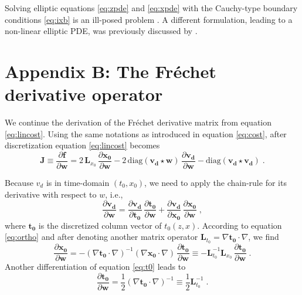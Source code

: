 Solving elliptic equations \ref{eq:zpde} and \ref{eq:xpde} with the Cauchy-type boundary conditions 
\ref{eq:ixb} is an ill-posed problem \cite[]{evans}. A different formulation, leading to a non-linear 
elliptic PDE, was previously discussed by \cite{cameron3}.

\appendix
\section{Appendix B: The Fr\'{e}chet derivative operator}

We continue the derivation of the Fr\'{e}chet derivative matrix from equation 
\ref{eq:lincost}. Using the same notations as introduced in equation \ref{eq:cost}, after discretization equation 
\ref{eq:lincost} becomes 
\begin{equation}
\label{eq:gradient}
\mathbf{J} \equiv \frac{\partial \mathbf{f}}{\partial \mathbf{w}} 
= 2\,\mathbf{L}_{x_0}\,\frac{\partial \mathbf{x_0}}{\partial \mathbf{w}} 
- 2\,\mbox{diag}(\mathbf{v_d} \star \mathbf{w})\,\frac{\partial \mathbf{v_d}}{\partial \mathbf{w}} 
- \mbox{diag}(\mathbf{v_d} \star \mathbf{v_d})\;.
\end{equation}

Because $v_d$ is in time-domain $(t_0,x_0)$, we need to apply the chain-rule for its derivative with respect to 
$w$, i.e.,
\begin{equation}
\label{eq:dvdix}
\frac{\partial \mathbf{v_d}}{\partial \mathbf{w}} = \frac{\partial \mathbf{v_d}}{\partial \mathbf{t_0}} 
\,\frac{\partial \mathbf{t_0}}{\partial \mathbf{w}} + \frac{\partial \mathbf{v_d}}{\partial \mathbf{x_0}} 
\,\frac{\partial \mathbf{x_0}}{\partial \mathbf{w}}\;,
\end{equation}
where $\mathbf{t_0}$ is the discretized column vector of $t_0 (z,x)$. According to equation \ref{eq:ortho} and 
after denoting another matrix operator $\mathbf{L}_{t_0} = \nabla \mathbf{t_0} \cdot \nabla$, we find
\begin{equation}
\label{eq:dortho}
\frac{\partial \mathbf{x_0}}{\partial \mathbf{w}} = 
- (\nabla \mathbf{t_0} \cdot \nabla)^{-1}(\nabla \mathbf{x_0} \cdot \nabla)\,
\frac{\partial \mathbf{t_0}}{\partial \mathbf{w}} \equiv 
- \mathbf{L}_{t_0}^{-1} \mathbf{L}_{x_0}\,\frac{\partial \mathbf{t_0}}{\partial \mathbf{w}}\;.
\end{equation}
Another differentiation of equation \ref{eq:t0} leads to
\begin{equation}
\label{eq:dt0}
\frac{\partial \mathbf{t_0}}{\partial \mathbf{w}} = \frac{1}{2} (\nabla \mathbf{t_0} \cdot \nabla)^{-1} 
\equiv \frac{1}{2} \mathbf{L}_{t_0}^{-1}\;.
\end{equation}

